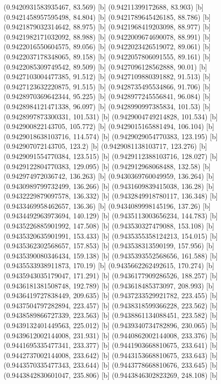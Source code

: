 {{{(0.9420931583935467, 83.569) [b] 
(0.94211399172688, 83.903) [b] 
(0.9421458957595498, 84.804) [b] 
(0.9421789645426185, 88.786) [b] 
(0.9421879032314642, 88.975) [b] 
(0.9421968419203098, 88.977) [b] 
(0.9421982171032092, 88.988) [b] 
(0.9422009674690078, 88.991) [b] 
(0.9422016550604575, 89.056) [b] 
(0.9422023426519072, 89.061) [b] 
(0.9422037178348065, 89.158) [b] 
(0.9422057806091555, 89.161) [b] 
(0.9422085309749542, 89.509) [b] 
(0.9427096128562888, 90.01) [b] 
(0.9427103004477385, 91.512) [b] 
(0.9427109880391882, 91.513) [b] 
(0.9427123632220875, 91.515) [b] 
(0.9428735495534866, 91.706) [b] 
(0.9428970369642344, 95.225) [b] 
(0.9428977245556841, 96.084) [b] 
(0.9428984121471338, 96.097) [b] 
(0.9428990997385834, 101.53) [b] 
(0.9428997873300331, 101.531) [b] 
(0.9429004749214828, 101.534) [b] 
(0.942900822143705, 105.772) [b] 
(0.9429015165881494, 106.104) [b] 
(0.9429018638103716, 114.574) [b] 
(0.9429029054770383, 123.195) [b] 
(0.942907072143705, 123.2) [b] 
(0.9429081138103717, 123.276) [b] 
(0.9429091554770384, 123.515) [b] 
(0.9429112388103716, 128.027) [b] 
(0.9429122804770383, 129.095) [b] 
(0.942912968068488, 132.58) [b] 
(0.942974972036742, 136.263) [b] 
(0.9430369760049959, 136.264) [b] 
(0.9430989799732499, 136.266) [b] 
(0.9431609839415038, 136.28) [b] 
(0.9432229879097578, 136.332) [b] 
(0.9432849918780117, 136.348) [b] 
(0.9433469958462657, 136.36) [b] 
(0.9434089998145196, 137.26) [b] 
(0.9434492963973694, 140.129) [b] 
(0.9435113003656234, 144.783) [b] 
(0.9435226885901992, 147.508) [b] 
(0.943530327479088, 153.108) [b] 
(0.9435320635901991, 153.433) [b] 
(0.9435355358124213, 154.015) [b] 
(0.9435362302568657, 157.853) [b] 
(0.943538313590199, 157.956) [b] 
(0.9435390080346434, 159.138) [b] 
(0.9435393552568656, 161.588) [b] 
(0.9435533938911873, 170.19) [b] 
(0.9435662262492615, 170.274) [b] 
(0.9435943035179047, 171.291) [b] 
(0.9436177909286526, 188.257) [b] 
(0.9436181381508748, 192.789) [b] 
(0.943618485373097, 208.993) [b] 
(0.9436419727838449, 209.635) [b] 
(0.9437233529921782, 223.455) [b] 
(0.9437504797282894, 223.457) [b] 
(0.9438318599366228, 223.562) [b] 
(0.9438589866727339, 223.563) [b] 
(0.9438861134088451, 223.582) [b] 
(0.9439132401449563, 225.012) [b] 
(0.9439340734782896, 230.065) [b] 
(0.9439612002144008, 231.931) [b] 
(0.9440862002144008, 233.376) [b] 
(0.9441695335477341, 233.377) [b] 
(0.9441903668810675, 233.641) [b] 
(0.9442737002144008, 233.642) [b] 
(0.9443153668810675, 233.643) [b] 
(0.9443570335477343, 233.644) [b] 
(0.9443778668810676, 233.645) [b] 
(0.9443842830601047, 235.806) [b] 
(0.9443846302823269, 248.108) [b] 
}}}
